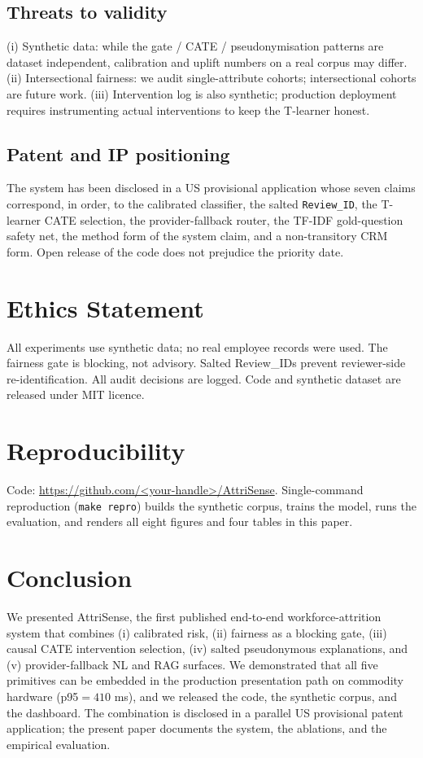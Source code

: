 \documentclass[conference]{IEEEtran}
\begin{document}
\subsection{Threats to validity}
(i) Synthetic data: while the gate / CATE / pseudonymisation patterns are
dataset independent, calibration and uplift numbers on a real corpus may
differ. (ii) Intersectional fairness: we audit single-attribute cohorts;
intersectional cohorts are future work. (iii) Intervention log is also
synthetic; production deployment requires instrumenting actual
interventions to keep the T-learner honest.

\subsection{Patent and IP positioning}
The system has been disclosed in a US provisional application whose seven
claims correspond, in order, to the calibrated classifier, the salted
\texttt{Review\_ID}, the T-learner CATE selection, the provider-fallback
router, the TF-IDF gold-question safety net, the method form of the system
claim, and a non-transitory CRM form. Open release of the code does not
prejudice the priority date.

\section{Ethics Statement}
All experiments use synthetic data; no real employee records were used.
The fairness gate is blocking, not advisory. Salted Review\_IDs prevent
reviewer-side re-identification. All audit decisions are logged. Code and
synthetic dataset are released under MIT licence.

\section{Reproducibility}
Code: \url{https://github.com/<your-handle>/AttriSense}.
Single-command reproduction (\texttt{make repro}) builds the synthetic
corpus, trains the model, runs the evaluation, and renders all eight
figures and four tables in this paper.

\section{Conclusion}
\label{sec:concl}
We presented AttriSense, the first published end-to-end workforce-attrition
system that combines (i) calibrated risk, (ii) fairness as a blocking gate,
(iii) causal CATE intervention selection, (iv) salted pseudonymous
explanations, and (v) provider-fallback NL and RAG surfaces. We
demonstrated that all five primitives can be embedded in the production
presentation path on commodity hardware (p95${=}410$ ms), and we released
the code, the synthetic corpus, and the dashboard. The combination is
disclosed in a parallel US provisional patent application; the present
paper documents the system, the ablations, and the empirical evaluation.
\end{document}
